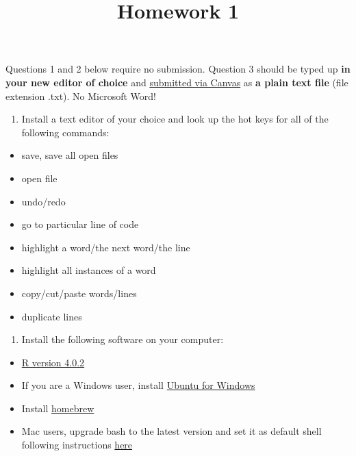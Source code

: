 \documentclass[]{article}
\title{Homework 1}
\author{}
\date{\vspace{-2.5em}}
\providecommand{\tightlist}{%
  \setlength{\itemsep}{0pt}\setlength{\parskip}{0pt}}
\begin{document}
\maketitle

Questions 1 and 2 below require no submission. Question 3 should be
typed up \textbf{in your new editor of choice} and
\href{https://canvas.emory.edu/courses/75677/assignments/376966}{submitted
via Canvas} as \textbf{a plain text file} (file extension .txt). No
Microsoft Word!

\begin{enumerate}
\def\labelenumi{\arabic{enumi}.}
\tightlist
\item
  Install a text editor of your choice and look up the hot keys for all
  of the following commands:
\end{enumerate}

\begin{itemize}
\tightlist
\item
  save, save all open files
\item
  open file
\item
  undo/redo
\item
  go to particular line of code
\item
  highlight a word/the next word/the line
\item
  highlight all instances of a word
\item
  copy/cut/paste words/lines
\item
  duplicate lines
\end{itemize}

\begin{enumerate}
\def\labelenumi{\arabic{enumi}.}
\setcounter{enumi}{1}
\tightlist
\item
  Install the following software on your computer:
\end{enumerate}

\begin{itemize}
\tightlist
\item
  \href{https://cloud.r-project.org/}{R version 4.0.2}
\item
  If you are a Windows user, install
  \href{https://www.microsoft.com/en-us/p/ubuntu/9nblggh4msv6?activetab=pivot:overviewtab}{Ubuntu
  for Windows}
\item
  Install \href{https://brew.sh/}{homebrew}
\item
  Mac users, upgrade bash to the latest version and set it as default
  shell following instructions
  \href{https://itnext.io/upgrading-bash-on-macos-7138bd1066ba}{here}
\end{itemize}
\end{document}
